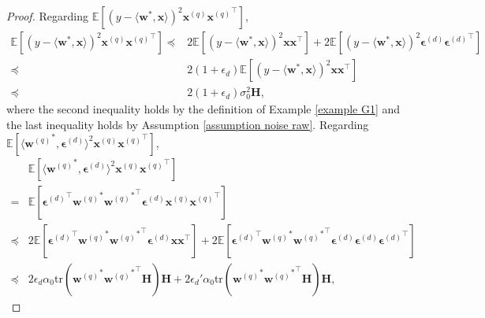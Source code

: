 \documentclass[11pt, letterpaper]{article}
\begin{document}
\begin{proof}
    Regarding $\mathbb{E}\left[(y-\langle \mathbf{w}^*,\mathbf{x}\rangle)^2{\mathbf{x}^{(q)}}{\mathbf{x}^{(q)}}^\top\right]$,
    \begin{equation}
    \label{G9}
        \begin{aligned}
            \mathbb{E}\left[(y-\langle \mathbf{w}^*,\mathbf{x}\rangle)^2{\mathbf{x}^{(q)}}{\mathbf{x}^{(q)}}^\top\right] \preceq& 2\mathbb{E}\left[(y-\langle \mathbf{w}^*,\mathbf{x}\rangle)^2{\mathbf{x}}{\mathbf{x}}^\top\right]+2\mathbb{E}\left[(y-\langle \mathbf{w}^*,\mathbf{x}\rangle)^2{\boldsymbol{\epsilon}^{(d)}}{\boldsymbol{\epsilon}^{(d)}}^\top\right]\\
            \preceq & 2(1+\epsilon_d)\mathbb{E}\left[(y-\langle \mathbf{w}^*,\mathbf{x}\rangle)^2{\mathbf{x}}{\mathbf{x}}^\top\right]\\
            \preceq & 2(1+\epsilon_d)\sigma_0^2\mathbf{H},
        \end{aligned}
    \end{equation}
    where the second inequality holds by the definition of Example \ref{example G1} and the last inequality holds by Assumption \ref{assumption noise raw}. Regarding $\mathbb{E}\left[\langle {\mathbf{w}^{(q)}}^*,\boldsymbol{\epsilon}^{(d)}\rangle^2{\mathbf{x}^{(q)}}{\mathbf{x}^{(q)}}^\top\right]$,
    \begin{equation}
    \label{G10}
        \begin{aligned}
            &\mathbb{E}\left[\langle {\mathbf{w}^{(q)}}^*,\boldsymbol{\epsilon}^{(d)}\rangle^2{\mathbf{x}^{(q)}}{\mathbf{x}^{(q)}}^\top\right]\\
            =&\mathbb{E}\left[{\boldsymbol{\epsilon}^{(d)}}^\top{\mathbf{w}^{(q)}}^*{{\mathbf{w}^{(q)}}^*}^\top \boldsymbol{\epsilon}^{(d)}{\mathbf{x}^{(q)}}{\mathbf{x}^{(q)}}^\top\right]\\
            \preceq & 2\mathbb{E}\left[{\boldsymbol{\epsilon}^{(d)}}^\top{\mathbf{w}^{(q)}}^*{{\mathbf{w}^{(q)}}^*}^\top \boldsymbol{\epsilon}^{(d)}{\mathbf{x}}{\mathbf{x}}^\top\right]+2\mathbb{E}\left[{\boldsymbol{\epsilon}^{(d)}}^\top{\mathbf{w}^{(q)}}^*{{\mathbf{w}^{(q)}}^*}^\top \boldsymbol{\epsilon}^{(d)}{\boldsymbol{\epsilon}^{(d)}}{\boldsymbol{\epsilon}^{(d)}}^\top\right]\\
            \preceq & 2\epsilon_d\alpha_0\mathrm{tr}({\mathbf{w}^{(q)}}^*{{\mathbf{w}^{(q)}}^*}^\top\mathbf{H})\mathbf{H}+2\epsilon_d' \alpha_0\mathrm{tr}({\mathbf{w}^{(q)}}^*{{\mathbf{w}^{(q)}}^*}^\top\mathbf{H})\mathbf{H},
        \end{aligned}

\end{equation}
\end{proof}
\end{document}
